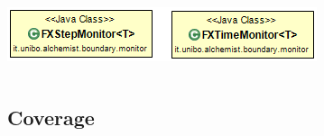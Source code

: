 \documentclass[%
]{beamer}
\begin{document}
\begin{frame}
\begin{columns}[onlytextwidth]
\begin{column}{.6\textwidth}
{                            \includegraphics[scale=0.45]{uml/FXTimeStepMonitor}
                        }
                    \end{column}
                \end{columns}
            \end{frame}

        \subsection{Coverage}\label{subsec:coverage}
            \begin{frame}
                \frametitle{\insertsection}
                \framesubtitle{\insertsubsection}
                \centering
            \end{frame}
\end{document}
